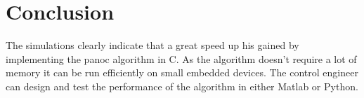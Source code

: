 \section{Conclusion}

The simulations clearly indicate that a great speed up his gained by implementing the panoc algorithm in C. As the algorithm doesn't require a lot of memory it can be run efficiently on small embedded devices. The control engineer can design and test the performance of the algorithm in either Matlab or Python.